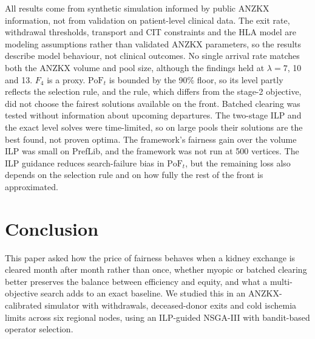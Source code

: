 \documentclass[journal]{IEEEtran}
\newcommand{\pof}{\ensuremath{\mathrm{PoF}_t}}
\begin{document}
All results come from synthetic simulation informed by public ANZKX
information, not from validation on patient-level clinical data. The
exit rate, withdrawal thresholds, transport and CIT constraints and
the HLA model are modeling assumptions rather than validated ANZKX
parameters, so the results describe model behaviour, not clinical
outcomes. No single arrival rate matches both the ANZKX volume and
pool size, although the findings held at $\lambda = 7$, 10 and 13.
$F_4$ is a proxy. $\pof$ is bounded by the 90\% floor, so its level
partly reflects the selection rule, and the rule, which differs from
the stage-2 objective, did not choose the fairest solutions available
on the front. Batched clearing was tested without information about
upcoming departures. The two-stage ILP and the exact level solves were
time-limited, so on large pools their solutions are the best found,
not proven optima. The framework's fairness gain over the volume ILP
was small on PrefLib, and the framework was not run at 500 vertices.
The ILP guidance reduces search-failure bias in $\pof$, but the
remaining loss also depends on the selection rule and on how fully the
rest of the front is approximated.

\section{Conclusion}
\label{sec:conclusion}

This paper asked how the price of fairness behaves when a kidney
exchange is cleared month after month rather than once, whether
myopic or batched clearing better preserves the balance between
efficiency and equity, and what a multi-objective search adds to an
exact baseline. We studied this in an ANZKX-calibrated simulator with
withdrawals, deceased-donor exits and cold ischemia limits across six
regional nodes, using an ILP-guided NSGA-III with bandit-based
operator selection.
\end{document}
